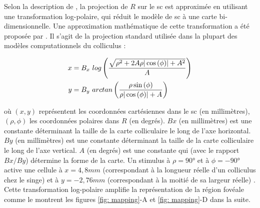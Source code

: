 Selon la description de \cite{Robinson:1972}, la projection de $R$ sur le \gls{sc} est approximée en utilisant une transformation log-polaire, qui réduit le modèle de \gls{sc} à une carte bi-dimensionnelle. Une approximation mathématique de cette transformation a été proposée par \cite{Ottes:1986}. Il s'agit de la projection standard utilisée dans la plupart des modèles computationnels du colliculus \cite{Optican:1995, Trappenberg:2001, Lefevre:1998, Marino:2008, Nakahara:2006} :

\begin{align}
  x &=
  B_x~log\left(\frac{\sqrt{\rho^{2}+2A\rho|\cos{(\phi)}|+A^{2}}}{A}\right) \notag \\
  y &=
  B_y~arctan\left(\frac{\rho \sin{(\phi)}}{\rho|\cos{(\phi)}|+A}\right)
  \label{eq: mapping}
\end{align}

où $(x,y)$ représentent les coordonnées cartésiennes dans le \gls{sc} (en millimètres), $(\rho,\phi)$ les coordonnées polaires dans $R$ (en degrés). $Bx$ (en millimètres) est une constante déterminant la taille de la carte colliculaire le long de l'axe horizontal. $By$ (en millimètres) est une constante déterminant la taille de la carte colliculaire le long de l'axe vertical. $A$ (en degrés) est une constante qui (avec le rapport $Bx/By$) détermine la forme de la carte. Un stimulus à $\rho=90°$ et à $\phi=-90°$ active une cellule à $x=4,8mm$ (correspondant à la longueur réelle d'un colliculus chez le singe) et à $y=-2,76mm$ (correspondant à la moitié de sa largeur réelle) \cite{Ottes:1986}. Cette transformation log-polaire amplifie la représentation de la région fovéale comme le montrent les figures \ref{fig: mapping}-A et \ref{fig: mapping}-D dans la suite.\\


